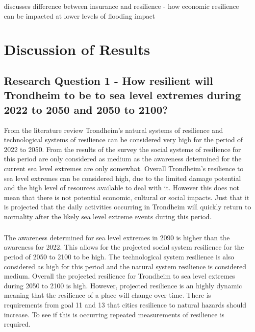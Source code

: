 



\cite{cutter_community_2020} discusses difference between insurance and resilience - how economic resilience can be impacted at lower levels of flooding impact

\chapter{Discussion of Results}

\section{Research Question 1 - How resilient will Trondheim to be to sea level extremes during 2022 to 2050 and 2050 to 2100? }

From the literature review Trondheim's natural systems of resilience and technological systems of resilience can be considered very high for the period of 2022 to 2050. From the results of the survey the  social systems of resilience for this period are only considered as medium as the awareness determined for the current sea level extremes are only somewhat. Overall Trondheim's resilience to sea level extremes can be considered high, due to the limited damage potential and the high level of resources available to deal with it. However this does not mean that there is not potential economic, cultural or social impacts. Just that it is projected that the daily activities occurring in Trondheim will quickly return to normality after the likely sea level extreme events during this period.
\paragraph{}
The awareness determined for sea level extremes in 2090 is higher than the awareness for 2022. This allows for the projected social system resilience for the period of 2050 to 2100 to be high. The technological system resilience is also considered as high for this period and the natural system resilience is considered medium. Overall the projected resilience for Trondheim to sea level extremes during 2050 to 2100 is high. However, projected resilience is an highly dynamic meaning that the resilience of a place will change over time. There is requirements from goal 11 and 13 that cities resilience to natural hazards should increase. To see if this is occurring repeated measurements of resilience is required. 

